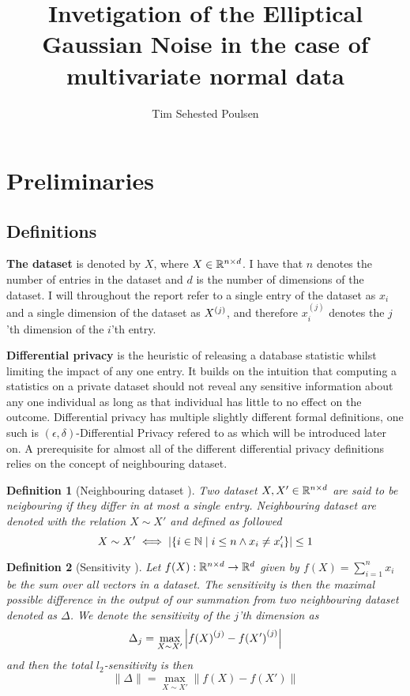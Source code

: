 \documentclass[a4paper,12pt]{article}
\title{Invetigation of the Elliptical Gaussian Noise in the case of multivariate normal data}
\author{Tim Sehested Poulsen}
\newtheorem{definition}{Definition}[section]
\begin{document}
\maketitle

\section{Preliminaries}
\subsection{Definitions}

\textbf{The dataset} is denoted by $X$, where 
$X \in \mathbb{R}^{n \times d}$.
I have that $n$ denotes the number of entries in the dataset and 
$d$ is the number of dimensions of the dataset.
I will throughout the report refer to a single entry of 
the dataset as $x_i$ and a single dimension of the dataset as $X^{(j)}$, 
and therefore $x^{(j)}_i$
denotes the $j$'th dimension of the $i$'th entry.
\vspace*{0.3cm}

\textbf{Differential privacy} is the heuristic of 
releasing a database statistic whilst limiting the impact
of any one entry. It builds on the intuition that computing
a statistics on a private dataset should not reveal 
any sensitive information about any one individual 
as long as that individual has little to no effect on the outcome.
Differential privacy has multiple slightly different
formal definitions, 
one such is $(\epsilon, \delta)$-Differential Privacy
refered to as \edp which will be introduced later on.
A prerequisite for almost all of the different differential privacy
definitions relies on the concept of neighbouring dataset.
\vspace*{0.3cm}

\begin{definition}[Neighbouring dataset \cite{dwork2016}]
Two dataset $X, X' \in \mathbb{R}^{n \times d}$ are said to be 
neigbouring if they differ in at most a single entry.
Neighbouring dataset are denoted with the relation $X \sim X'$ and defined as followed
\[ X \sim X' \iff \left | \left \{ i \in \mathbb{N} \; \text{\textbar} \; i \le n \land x_i \ne x_i' \right\} \right| \le 1 \]
\end{definition}

\begin{definition}[Sensitivity \cite{Lebeda2022}]
Let $f(X): \mathbb{R}^{n \times d} \rightarrow \mathbb{R}^d$ given by 
$f(X) = \sum_{i = 1}^n x_i$ be the sum over all vectors in a dataset.
The sensitivity is then the maximal 
possible difference in the output of our summation  
from two neighbouring dataset denoted as $\Delta$.
We denote the sensitivity of the $j$'th dimension as
\[
\Delta_j = \max_{X \sim X'} \left |{f(X)}^{(j)} - {f(X')}^{(j)}\right| 
\]
and then the total $l_2$-sensitivity is then
\begin{equation}
    \label{eq:l2sens}
    \| \Delta \| = \max_{X \sim X'} \left\| {f(X)} - {f(X')} \right\|  
\end{equation}
    
\end{definition}
\end{document}
